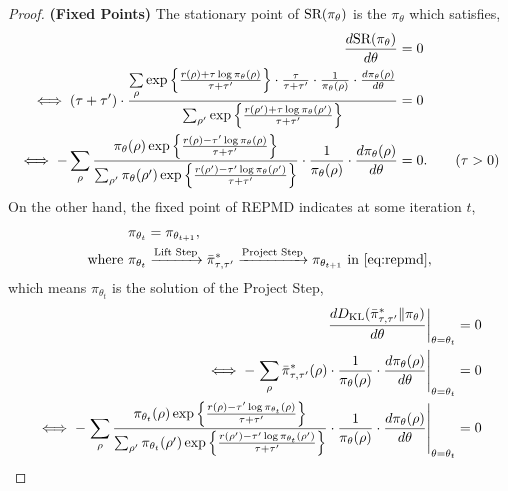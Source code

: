 \begin{proof}
	{\bf (Fixed Points)} The stationary point of $\text{SR}(\pi_{\theta})$ is the $\pi_\theta$ which satisfies,
	\begin{equation}
	\label{eq:stationary_point_of_sr}
	\begin{split}
		\frac{d \text{SR}(\pi_{\theta})}{d \theta} &= 0 \\
		\iff (\tau + \tau^\prime) \cdot \frac{ \sum\limits_{\rho}{ \exp\left\{ \frac{r(\rho) + \tau \log{\pi_\theta(\rho)} }{\tau + \tau^{\prime}} \right\} } \cdot \frac{\tau}{ \tau + \tau^\prime} \cdot \frac{1}{ \pi_\theta(\rho)} \cdot \frac{d \pi_{\theta}(\rho)}{d \theta} }{  \sum_{\rho^\prime}{ \exp\left\{ \frac{r(\rho^\prime) + \tau \log{\pi_\theta(\rho^\prime)} }{\tau + \tau^{\prime}} \right\} } } &= 0 \\
		\iff - \sum\limits_{\rho}{ \frac{ \pi_\theta(\rho) \exp\left\{ \frac{r(\rho) - \tau^\prime \log{\pi_\theta(\rho)} }{\tau + \tau^{\prime}} \right\}  }{  \sum_{\rho^\prime}{ \pi_\theta(\rho^\prime) \exp\left\{ \frac{r(\rho^\prime) - \tau^\prime \log{\pi_\theta(\rho^\prime)} }{\tau + \tau^{\prime}} \right\} } } \cdot \frac{1}{ \pi_\theta(\rho)} \cdot \frac{d \pi_{\theta}(\rho)}{d \theta} } &= 0. \qquad (\tau > 0)
	\end{split}
	\end{equation}
	On the other hand, the fixed point of REPMD indicates at some iteration $t$,
	\begin{equation}
	\label{eq:fixed_point_of_REPMD_iter}
	\begin{split}
		&\pi_{\theta_t} = \pi_{\theta_{t+1}}, \\
		\text{where } &\pi_{\theta_t} \xrightarrow{\text{Lift Step}} \bar{\pi}_{\tau,\tau^{\prime}}^* \xrightarrow{\text{Project Step}} \pi_{\theta_{t+1}} \text{ in \cref{eq:repmd}},
	\end{split}
	\end{equation}
	which means $\pi_{\theta_t}$ is the solution of the Project Step,
	\begin{equation}
	\label{eq:solution_of_project_step_repmd}
	\begin{split}
		\left. \frac{d \KL( \bar{\pi}_{\tau,\tau^{\prime}}^* \| \pi_{\theta}) }{d \theta} \right\vert_{\theta = \theta_t} &= 0 \\
		\iff - \left. \sum\limits_{\rho}{ \bar{\pi}_{\tau,\tau^{\prime}}^*(\rho) \cdot \frac{1}{ \pi_\theta(\rho)} \cdot \frac{d \pi_{\theta}(\rho)}{d \theta} } \right\vert_{\theta = \theta_t} &= 0 \\
		\iff - \left. \sum\limits_{\rho}{ \frac{ \pi_{\theta_t}(\rho) \exp\left\{ \frac{r(\rho) - \tau^\prime \log{\pi_{\theta_t}(\rho)} }{\tau + \tau^{\prime}} \right\}  }{  \sum_{\rho^\prime}{ \pi_{\theta_t}(\rho^\prime) \exp\left\{ \frac{r(\rho^\prime) - \tau^\prime \log{\pi_{\theta_t}(\rho^\prime)} }{\tau + \tau^{\prime}} \right\} } } \cdot \frac{1}{ \pi_\theta(\rho)} \cdot \frac{d \pi_{\theta}(\rho)}{d \theta} } \right\vert_{\theta = \theta_t} &= 0 \\

\end{split}
\end{equation}
\end{proof}
